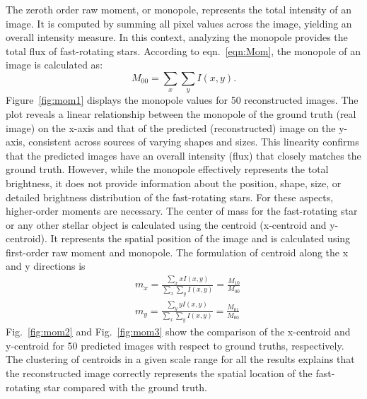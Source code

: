 The zeroth order raw moment, or monopole, represents the total intensity of an image. It is computed by summing all pixel values across the image, yielding an overall intensity measure. In this context, analyzing the monopole provides the total flux of fast-rotating stars. According to eqn.~\ref{eqn:Mom}, the monopole of an image is calculated as:
\begin{equation}
	M_{00} = \sum_{x} \sum_{y} I(x, y).
\end{equation}
Figure~\ref{fig:mom1} displays the monopole values for 50 reconstructed images. The plot reveals a linear relationship between the monopole of the ground truth (real image) on the x-axis and that of the predicted (reconstructed) image on the y-axis, consistent across sources of varying shapes and sizes. This linearity confirms that the predicted images have an overall intensity (flux) that closely matches the ground truth. However, while the monopole effectively represents the total brightness, it does not provide information about the position, shape, size, or detailed brightness distribution of the fast-rotating stars. For these aspects, higher-order moments are necessary.
The center of mass for the fast-rotating star or any other stellar object is calculated using the centroid (x-centroid and y-centroid). It represents the spatial position of the image and is calculated using first-order raw moment and monopole. The formulation of centroid along the x and y directions is
\begin{equation}
	\begin{aligned}
		&m_x = \frac{\sum_{x} x I(x,y)}{\sum_{x} \sum_{y} I(x, y)} = \frac{M_{10}}{M_{00}} \\
		&m_y = \frac{\sum_{y} y I(x,y)}{\sum_{x} \sum_{y} I(x, y)} = \frac{M_{01}}{M_{00}}
	\end{aligned}  
\end{equation}
Fig.~\ref{fig:mom2} and Fig.~\ref{fig:mom3} show the comparison of the x-centroid and y-centroid for 50 predicted images with respect to ground truths, respectively. The clustering of centroids in a given scale range for all the results explains that the reconstructed image correctly represents the spatial location of the fast-rotating star compared with the ground truth.


